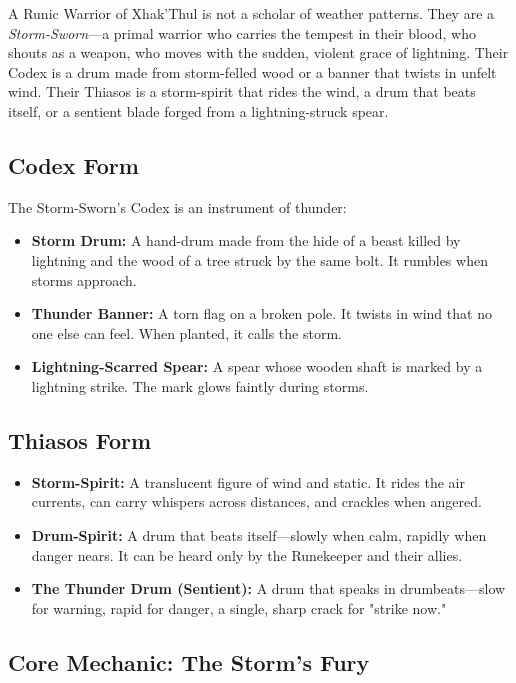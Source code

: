 A Runic Warrior of Xhak'Thul is not a scholar of weather patterns. They are a \textit{Storm-Sworn}—a primal warrior who carries the tempest in their blood, who shouts as a weapon, who moves with the sudden, violent grace of lightning. Their Codex is a drum made from storm-felled wood or a banner that twists in unfelt wind. Their Thiasos is a storm-spirit that rides the wind, a drum that beats itself, or a sentient blade forged from a lightning-struck spear.

\subsection{Codex Form}

The Storm-Sworn's Codex is an instrument of thunder:

\begin{itemize}
\item \textbf{Storm Drum:} A hand-drum made from the hide of a beast killed by lightning and the wood of a tree struck by the same bolt. It rumbles when storms approach.
\item \textbf{Thunder Banner:} A torn flag on a broken pole. It twists in wind that no one else can feel. When planted, it calls the storm.
\item \textbf{Lightning-Scarred Spear:} A spear whose wooden shaft is marked by a lightning strike. The mark glows faintly during storms.
\end{itemize}

\subsection{Thiasos Form}

\begin{itemize}
\item \textbf{Storm-Spirit:} A translucent figure of wind and static. It rides the air currents, can carry whispers across distances, and crackles when angered.
\item \textbf{Drum-Spirit:} A drum that beats itself—slowly when calm, rapidly when danger nears. It can be heard only by the Runekeeper and their allies.
\item \textbf{The Thunder Drum (Sentient):} A drum that speaks in drumbeats—slow for warning, rapid for danger, a single, sharp crack for "strike now."
\end{itemize}

\subsection{Core Mechanic: The Storm's Fury}

